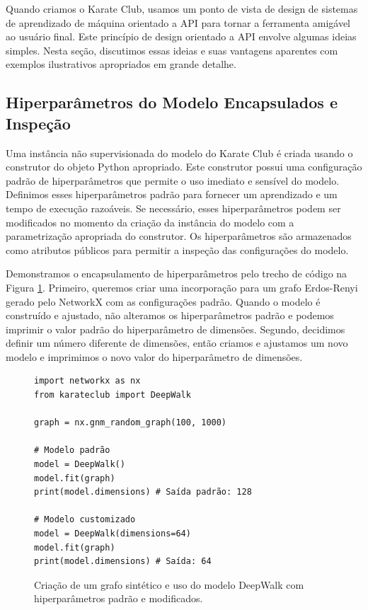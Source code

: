 \documentclass[sigconf]{acmart}
\begin{document}
Quando criamos o Karate Club, usamos um ponto de vista de design de sistemas de aprendizado de máquina orientado a API \cite{ScikitLearn} para tornar a ferramenta amigável ao usuário final. Este princípio de design orientado a API envolve algumas ideias simples. Nesta seção, discutimos essas ideias e suas vantagens aparentes com exemplos ilustrativos apropriados em grande detalhe.

\subsection{Hiperparâmetros do Modelo Encapsulados e Inspeção}

Uma instância não supervisionada do modelo do Karate Club é criada usando o construtor do objeto Python apropriado. Este construtor possui uma configuração padrão de hiperparâmetros que permite o uso imediato e sensível do modelo. Definimos esses hiperparâmetros padrão para fornecer um aprendizado e um tempo de execução razoáveis. Se necessário, esses hiperparâmetros podem ser modificados no momento da criação da instância do modelo com a parametrização apropriada do construtor. Os hiperparâmetros são armazenados como atributos públicos para permitir a inspeção das configurações do modelo.

Demonstramos o encapsulamento de hiperparâmetros pelo trecho de código na Figura \ref{fig:code1}. Primeiro, queremos criar uma incorporação para um grafo Erdos-Renyi gerado pelo NetworkX com as configurações padrão. Quando o modelo é construído e ajustado, não alteramos os hiperparâmetros padrão e podemos imprimir o valor padrão do hiperparâmetro de dimensões. Segundo, decidimos definir um número diferente de dimensões, então criamos e ajustamos um novo modelo e imprimimos o novo valor do hiperparâmetro de dimensões.

\begin{figure}[h]
\begin{lstlisting}
import networkx as nx
from karateclub import DeepWalk

graph = nx.gnm_random_graph(100, 1000)

# Modelo padrão
model = DeepWalk()
model.fit(graph)
print(model.dimensions) # Saída padrão: 128

# Modelo customizado
model = DeepWalk(dimensions=64)
model.fit(graph)
print(model.dimensions) # Saída: 64
\end{lstlisting}
\caption{Criação de um grafo sintético e uso do modelo DeepWalk com hiperparâmetros padrão e modificados.}
\label{fig:code1}
\end{figure}
\end{document}
